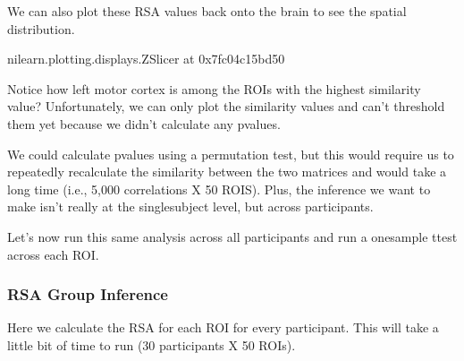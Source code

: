 \documentclass[letterpaper,10pt,english]{sphinxmanual}
\begin{document}
\noindent{}

We can also plot these RSA values back onto the brain to see the spatial distribution.

\begin{sphinxVerbatim}[commandchars=\\\{\}]
   

     
\end{sphinxVerbatim}

\begin{sphinxVerbatim}[commandchars=\\\{\}]
\PYGZlt{}nilearn.plotting.displays.ZSlicer at 0x7fc04c15bd50\PYGZgt{}
\end{sphinxVerbatim}

\noindent{}

Notice how left motor cortex is among the ROIs with the highest similarity value?  Unfortunately, we can only plot the similarity values and can’t threshold them yet because we didn’t calculate any p\sphinxhyphen{}values.

We could calculate p\sphinxhyphen{}values using a permutation test, but this would require us to repeatedly recalculate the similarity between the two matrices and would take a long time (i.e., 5,000 correlations X 50 ROIS). Plus, the inference we want to make isn’t really at the single\sphinxhyphen{}subject level, but across participants.

Let’s now run this same analysis across all participants and run a one\sphinxhyphen{}sample t\sphinxhyphen{}test across each ROI.


\subsubsection{RSA Group Inference}
\label{\detokenize{content/RSA:rsa-group-inference}}
Here we calculate the RSA for each ROI for every participant.  This will take a little bit of time to run (30 participants X 50 ROIs).
\end{document}
